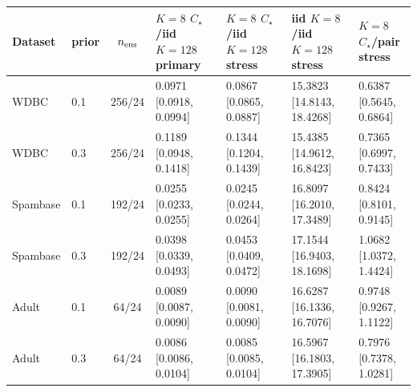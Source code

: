 \begin{tabular}{llcllll}
\toprule
Dataset & prior & $n_{\rm ens}$ & $K=8$ $C_\star$/iid $K=128$ primary & $K=8$ $C_\star$/iid $K=128$ stress & iid $K=8$/iid $K=128$ stress & $K=8$ $C_\star$/pair stress \\
\midrule
WDBC & 0.1 & 256/24 & 0.0971 [0.0918, 0.0994] & 0.0867 [0.0865, 0.0887] & 15.3823 [14.8143, 18.4268] & 0.6387 [0.5645, 0.6864] \\
WDBC & 0.3 & 256/24 & 0.1189 [0.0948, 0.1418] & 0.1344 [0.1204, 0.1439] & 15.4385 [14.9612, 16.8423] & 0.7365 [0.6997, 0.7433] \\
Spambase & 0.1 & 192/24 & 0.0255 [0.0233, 0.0255] & 0.0245 [0.0244, 0.0264] & 16.8097 [16.2010, 17.3489] & 0.8424 [0.8101, 0.9145] \\
Spambase & 0.3 & 192/24 & 0.0398 [0.0339, 0.0493] & 0.0453 [0.0409, 0.0472] & 17.1544 [16.9403, 18.1698] & 1.0682 [1.0372, 1.4424] \\
Adult & 0.1 & 64/24 & 0.0089 [0.0087, 0.0090] & 0.0090 [0.0081, 0.0090] & 16.6287 [16.1336, 16.7076] & 0.9748 [0.9267, 1.1122] \\
Adult & 0.3 & 64/24 & 0.0086 [0.0086, 0.0104] & 0.0085 [0.0085, 0.0104] & 16.5967 [16.1803, 17.3905] & 0.7976 [0.7378, 1.0281] \\
\bottomrule
\end{tabular}
